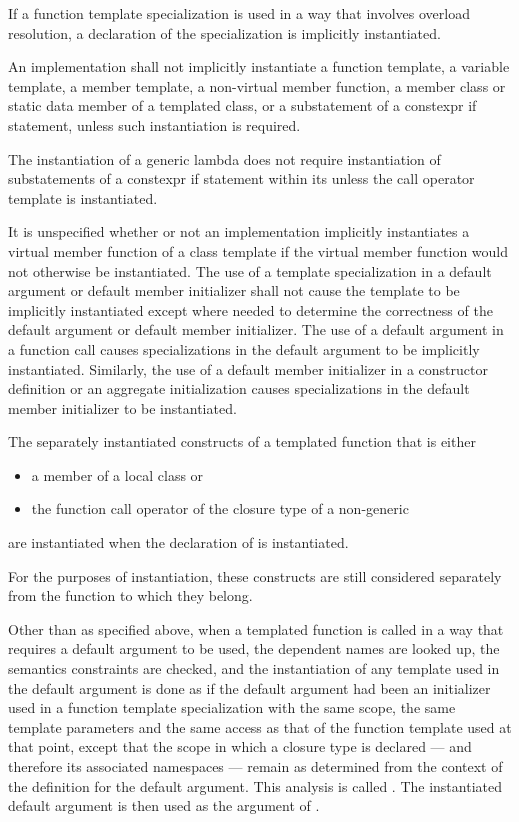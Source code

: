 \pnum
If a function template specialization is used in
a way that involves overload resolution,
a declaration of the specialization is implicitly instantiated.

\pnum
An implementation shall not implicitly instantiate a function template,
a variable template,
a member template, a non-virtual member function, a member class or
static data member of a templated class, or a substatement of a constexpr if
statement, unless such instantiation is required.
\begin{note}
The instantiation of a generic lambda
does not require instantiation of
substatements of a constexpr if statement
within its 
unless the call operator template is instantiated.
\end{note}
It is unspecified whether or not an implementation implicitly instantiates a
virtual member function of a class template if the virtual member function would
not otherwise be instantiated.
The use of a template specialization in
a default argument or default member initializer
shall not cause the template to be implicitly instantiated except
where needed to determine
the correctness of the default argument or default member initializer.
The use of a default argument in a
function call causes specializations in the default argument to be implicitly
instantiated.
Similarly, the use of a default member initializer
in a constructor definition or an aggregate initialization
causes specializations in the default member initializer to be instantiated.

\pnum
The separately instantiated constructs
of a templated function  that is either
\begin{itemize}
\item
a member of a local class or
\item
the function call operator of the closure type
of a non-generic 
\end{itemize}
are instantiated when the declaration of  is instantiated.
\begin{note}
For the purposes of instantiation,
these constructs are still considered separately
from the function to which they belong.
\end{note}

\pnum
Other than as specified above,
when a templated function
is called in a way that requires a default argument to be used,
the dependent names are looked up, the semantics constraints are checked,
and the instantiation of any template used in the default argument
is done as if the default argument had been
an initializer used in a function template specialization with the same scope,
the same template parameters and the same access as that of the function template
used at that point, except that the scope in which a closure type is
declared --- and therefore its associated namespaces ---
remain as determined from the context of the definition for the default
argument.
This analysis is called
.
The instantiated default argument is then used as the argument of
.

